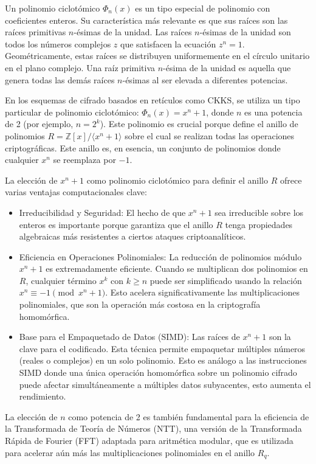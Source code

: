 Un polinomio ciclotómico $\Phi_n(x)$ es un tipo especial de polinomio con coeficientes enteros. Su característica más relevante es que sus raíces son las raíces primitivas $n$-ésimas de la unidad. Las raíces $n$-ésimas de la unidad son todos los números complejos $z$ que satisfacen la ecuación $z^n = 1$. Geométricamente, estas raíces se distribuyen uniformemente en el círculo unitario en el plano complejo. Una raíz primitiva $n$-ésima de la unidad es aquella que genera todas las demás raíces $n$-ésimas al ser elevada a diferentes potencias.

En los esquemas de cifrado basados en retículos como CKKS, se utiliza un tipo particular de polinomio ciclotómico: $\Phi_n(x) = x^n + 1$, donde $n$ es una potencia de 2 (por ejemplo, $n=2^k$). Este polinomio es crucial porque define el anillo de polinomios $R = \mathbb{Z}[x] / \langle x^n + 1 \rangle$ sobre el cual se realizan todas las operaciones criptográficas. Este anillo es, en esencia, un conjunto de polinomios donde cualquier $x^n$ se reemplaza por $-1$.

La elección de $x^n + 1$ como polinomio ciclotómico para definir el anillo $R$ ofrece varias ventajas computacionales clave:

\begin{itemize}
    \item Irreducibilidad y Seguridad: El hecho de que $x^n+1$ sea irreducible sobre los enteros es importante porque garantiza que el anillo $R$ tenga propiedades algebraicas más resistentes a ciertos ataques criptoanalíticos.
    \item Eficiencia en Operaciones Polinomiales: La reducción de polinomios módulo $x^n + 1$ es extremadamente eficiente. Cuando se multiplican dos polinomios en $R$, cualquier término $x^k$ con $k \ge n$ puede ser simplificado usando la relación $x^n \equiv -1 \pmod{x^n + 1}$. Esto acelera significativamente las multiplicaciones polinomiales, que son la operación más costosa en la criptografía homomórfica.
    \item Base para el Empaquetado de Datos (SIMD): Las raíces de $x^n+1$ son la clave para el codificado. Esta técnica permite empaquetar múltiples números (reales o complejos) en un solo polinomio. Esto es análogo a las instrucciones SIMD donde una única operación homomórfica sobre un polinomio cifrado puede afectar simultáneamente a múltiples datos subyacentes, esto aumenta el rendimiento.
\end{itemize}

La elección de $n$ como potencia de 2 es también fundamental para la eficiencia de la Transformada de Teoría de Números (NTT), una versión de la Transformada Rápida de Fourier (FFT) adaptada para aritmética modular, que es utilizada para acelerar aún más las multiplicaciones polinomiales en el anillo $R_q$. 

